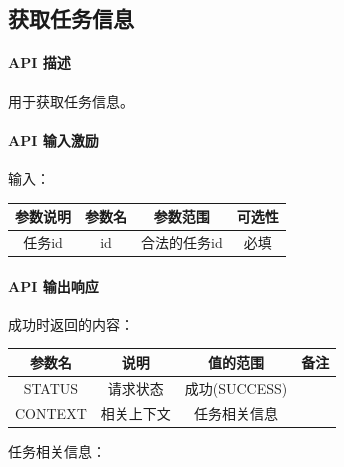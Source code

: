 \documentclass[UTF8]{article}
\def\apiintr{\paragraph{\colorbox[rgb]{1.0,0.6,0.65}{API 描述}}} %
\def\apiexc{\paragraph{\colorbox[rgb]{1,0.85,0.45}{API 输入激励}}} %
\def\apiresp{\paragraph{\colorbox[rgb]{0.9,0.9,1}{API 输出响应}}} %
\def\成功{\colorbox[rgb]{0.4,1,0.5}{成功}}
\def\成功V{成功(SUCCESS)}
\begin{document}
    \subsection{获取任务信息}
    \apiintr
    用于获取任务信息。
    \apiexc
    输入：\\
    \begin{tabular}{|c|c|c|c|}
        \hline \rule[-2ex]{0pt}{5.5ex} 参数说明 & 参数名 & 参数范围 & 可选性 \\
        \hline \rule[-2ex]{0pt}{5.5ex} 任务id & id & 合法的任务id & 必填 \\
        \hline 
    \end{tabular} 
    \apiresp
    \成功 时返回的内容：\\
    \begin{tabular}{|c|c|c|c|}
        \hline \rule[-2ex]{0pt}{5.5ex} 参数名 & 说明 & 值的范围 & 备注 \\
        \hline \rule[-2ex]{0pt}{5.5ex} STATUS & 请求状态 & \成功V &  \\ 
        \hline \rule[-2ex]{0pt}{5.5ex} CONTEXT & 相关上下文 & 任务相关信息 &  \\
        \hline 
    \end{tabular} 
    \par 任务相关信息： \\
\end{document}

